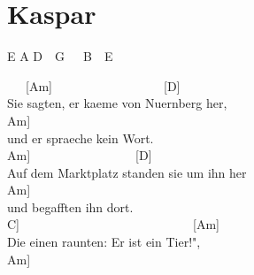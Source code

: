 \documentclass[
  letterpaper,
  twoside=false]{scrbook}
\begin{document}
\hypertarget{kaspar}{%
\chapter{Kaspar}\label{kaspar}}

E A D~~G~~~B~~E

~~~{[}Am{]}~~~~~~~~~~~~~~~~~~{[}D{]}\\
Sie sagten, er kaeme von Nuernberg her,\\
\hspace*{0.333em}\hspace*{0.333em}\hspace*{0.333em}\hspace*{0.333em}\hspace*{0.333em}\hspace*{0.333em}\hspace*{0.333em}{[}Am{]}\\
und er spraeche kein Wort.\\
\hspace*{0.333em}\hspace*{0.333em}\hspace*{0.333em}\hspace*{0.333em}\hspace*{0.333em}\hspace*{0.333em}\hspace*{0.333em}\hspace*{0.333em}{[}Am{]}~~~~~~~~~~~~~~~~~{[}D{]}~~~\\
Auf dem Marktplatz standen sie um ihn her\\
\hspace*{0.333em}\hspace*{0.333em}\hspace*{0.333em}\hspace*{0.333em}\hspace*{0.333em}\hspace*{0.333em}{[}Am{]}\\
und begafften ihn dort.\\
\hspace*{0.333em}\hspace*{0.333em}\hspace*{0.333em}{[}C{]}~~~~~~~~~~~~~~~~~~~~~~~~~~~~{[}Am{]}\\
Die einen raunten: Er ist ein Tier!",~~\\
\hspace*{0.333em}\hspace*{0.333em}\hspace*{0.333em}\hspace*{0.333em}\hspace*{0.333em}\hspace*{0.333em}\hspace*{0.333em}\hspace*{0.333em}\hspace*{0.333em}\hspace*{0.333em}{[}Am{]}\\
\end{document}
